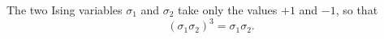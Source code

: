 \documentclass{article}
\begin{document}
The two Ising variables $\sigma_1$ and $\sigma_2$ take only the values $+1$ and $-1$, so that
\begin{equation}
(\sigma_1\sigma_2)^3 = \sigma_1\sigma_2 .
\label{eq:cube}
\end{equation}
\end{document}
